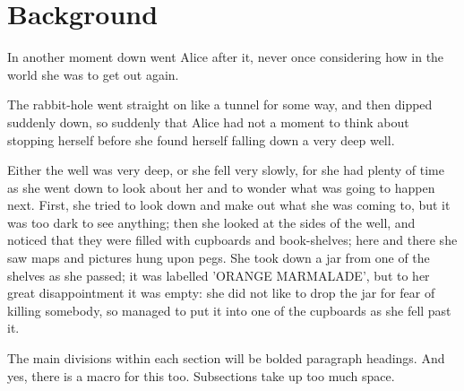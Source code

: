 \section{Background}
\label{sec-background}

In another moment down went Alice after it, never once considering
how in the world she was to get out again.

The rabbit-hole went straight on like a tunnel for some way, and then
dipped suddenly down, so suddenly that Alice had not a moment to
think about stopping herself before she found herself falling down a
very deep well.

Either the well was very deep, or she fell very slowly, for she had
plenty of time as she went down to look about her and to wonder what
was going to happen next.
First, she tried to look down and make out what she was coming to,
but it was too dark to see anything; then she looked at the sides of
the well, and noticed that they were filled with cupboards and
book-shelves; here and there she saw maps and pictures hung upon
pegs.
She took down a jar from one of the shelves as she passed; it was
labelled 'ORANGE MARMALADE', but to her great disappointment it was
empty: she did not like to drop the jar for fear of killing somebody,
so managed to put it into one of the cupboards as she fell past it.


The main divisions within each section will be bolded paragraph
headings.
And yes, there is a macro for this too.
Subsections take up too much space.
